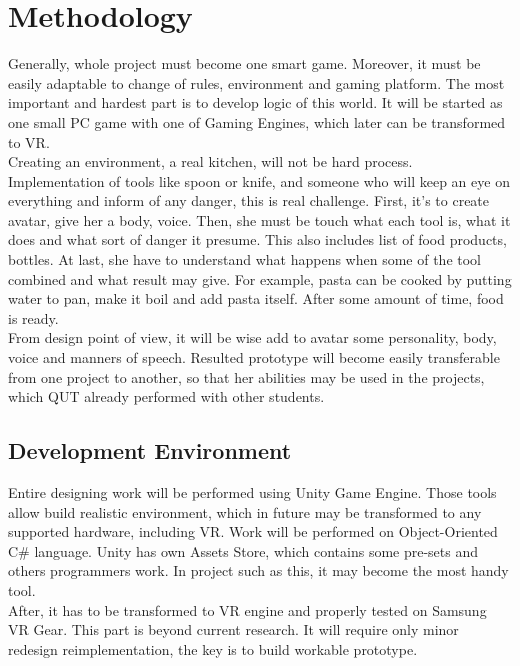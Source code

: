 \documentclass[18pt]{article}
\numberwithin{equation}{section} %
\numberwithin{figure}{section} %
\numberwithin{table}{section} %
\begin{document}
\section{Methodology}	
	Generally, whole project must become one smart game. Moreover, it must be easily adaptable to change of rules, environment and gaming platform. The most important and hardest part is to develop logic of this world. It will be started as one small PC game with one of Gaming Engines, which later can be transformed to VR. \\
	
	Creating an environment, a real kitchen, will not be hard process. Implementation of tools like spoon or knife, and someone who will keep an eye on everything and inform of any danger, this is real challenge. First, it's to create avatar, give her a body, voice. Then, she must be touch what each tool is, what it does and what sort of danger it presume. This also includes list of food products, bottles. At last, she have to understand what happens when some of the tool combined and what result may give. For example, pasta can be cooked by putting water to pan, make it boil and add pasta itself. After some amount of time, food is ready. \\
	
	From design point of view, it will be wise add to avatar some personality, body, voice and manners of speech. Resulted prototype will become easily transferable from one project to another, so that her abilities may be used in the projects, which QUT already performed with other students. \\
	
	\subsection{Development Environment}
		Entire designing work will be performed using Unity Game Engine. Those tools allow build realistic environment, which in future may be transformed to any supported hardware, including VR. Work will be performed on Object-Oriented C\# language. Unity has own Assets Store, which contains some pre-sets and others programmers work. In project such as this, it may become the most handy tool. \\
		
		After, it has to be transformed to VR engine and properly tested on Samsung VR Gear. This part is beyond current research. It will require only minor redesign reimplementation, the key is to build workable prototype. \\
	
\end{document}
